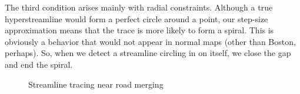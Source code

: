 \documentclass[twocolumn]{article}
\begin{document}
The third condition arises mainly with radial constraints. Although a true
hyperstreamline would form a perfect circle around a point, our step-size
approximation means that the trace is more likely to form a spiral. This is
obviously a behavior that would not appear in normal maps (other than Boston,
perhaps). So, when we detect a streamline circling in on itself, we close the
gap and end the spiral.

\begin{figure}[t!]
    \centering
    \caption{Streamline tracing near road merging}
\end{figure}
\end{document}
